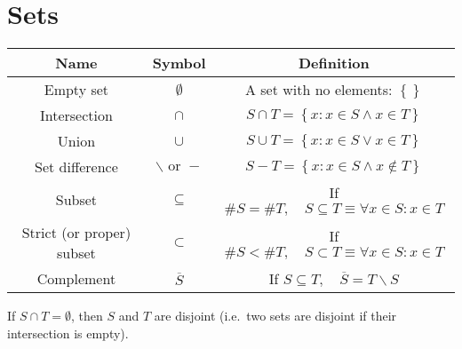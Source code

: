 \documentclass{article}
\DeclareMathOperator{\setunion}{\cup} %
\DeclareMathOperator{\setintersection}{\cap}
\begin{document}
\section{Sets}
\begin{table}[H]
    \centering
    \begin{tabular}{c c c}
        \textbf{Name}             & \textbf{Symbol}              & \textbf{Definition}                                               \\
        \midrule
        Empty set                 & \(\emptyset\)                & A set with no elements: \(\left\{{}\right\}\)                     \\
        Intersection              & \(\setintersection\)         & \(S \setintersection T = \left\{x:x\in S \land x \in T\right\}\)  \\
        Union                     & \(\setunion\)                & \(S \setunion T = \left\{x:x\in S \lor x \in T\right\}\)          \\
        Set difference            & \(\backslash \text{ or } -\) & \(S - T = \left\{x:x\in S \land x \notin T\right\}\)              \\
        Subset                    & \(\subseteq\)                & If \(\#S=\#T, \quad S \subseteq T \equiv \forall x\in S:x \in T\) \\
        Strict (or proper) subset & \(\subset\)                  & If \(\#S<\#T, \quad S \subset T \equiv \forall x\in S:x \in T\)   \\
        Complement                & \(\overline{S}\)             & If \(S \subseteq T, \quad \overline{S}=T \backslash S\)
    \end{tabular}\label{tab:Set Symbols}
\end{table}
%
\begin{definition}[Disjoint]
    If \(S \setintersection T = \emptyset\), then \(S\) and \(T\) are disjoint
    (i.e.\ two sets are disjoint if their intersection is empty).
\end{definition}
%
\end{document}
